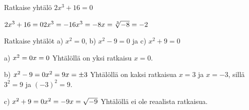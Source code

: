 \begin{esimerkki}
Ratkaise yhtälö $2x^3 + 16 = 0$

	$2x^3 + 16 = 0 \\
	2x^3 = -16 \\
	x^3 = -8  \\
	x = \sqrt[3]{-8} = -2 $
\end{esimerkki}


\begin{esimerkki}
Ratkaise yhtälöt a) $x^2 = 0$, b) $x^2 - 9 = 0$ ja c) $x^2 + 9 = 0$

a)	$x^2 = 0 \\
	x = 0 \\$
	Yhtälöllä on yksi ratkaisu $x = 0$.

b)	$x^2 - 9 = 0 \\
	x^2 = 9 \\
	x = \pm 3 \\$
	Yhtälöllä on kaksi ratkaisua $x = 3$ ja $x = -3$, sillä $3^2 = 9$ ja $(-3)^2 = 9$.

c)	$x^2 + 9 = 0 \\
	x^2 = -9 \\
	x = \sqrt{-9} \\$
	Yhtälöllä ei ole reaalista ratkaisua.
\end{esimerkki}
